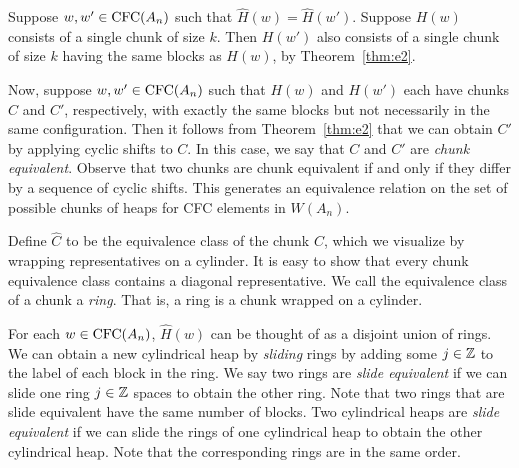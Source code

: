     Suppose $w,w' \in \operatorname{\mathrm{CFC}}(A_n)$ such that $\hat{H}(w) = \hat{H}(w')$. Suppose $H(w)$ consists of a single chunk of size $k$. Then $H(w')$ also consists of a single chunk of size $k$ having the same blocks as $H(w)$, by Theorem~\ref{thm:e2}.
    
    Now, suppose $w,w' \in \operatorname{\mathrm{CFC}}(A_n)$ such that $H(w)$ and $H(w')$ each have chunks $C$ and $C'$, respectively, with exactly the same blocks but not necessarily in the same configuration. Then it follows from Theorem~\ref{thm:e2} that we can obtain $C'$ by applying cyclic shifts to $C$.
    In this case, we say that $C$ and $C'$ are \emph{chunk equivalent}.
    Observe that two chunks are chunk equivalent if and only if they differ by a sequence of cyclic shifts. This generates an equivalence relation on the set of possible chunks of heaps for CFC elements in $W(A_n)$.

    Define $\hat{C}$ to be the equivalence class of the chunk $C$, which we visualize by wrapping representatives on a cylinder. It is easy to show that every chunk equivalence class contains a diagonal representative.
    We call the equivalence class of a chunk a \emph{ring}. That is, a ring is a chunk wrapped on a cylinder.
    
    For each $w \in \operatorname{\mathrm{CFC}}(A_n)$, $\hat{H}(w)$ can be thought of as a disjoint union of rings. We can obtain a new cylindrical heap by \emph{sliding} rings by adding some $j \in \mathbb{Z}$ to the label of each block in the ring.
    We say two rings are \emph{slide equivalent} if we can slide one ring $j \in \mathbb{Z}$ spaces to obtain the other ring.
    Note that two rings that are slide equivalent have the same number of blocks.
    Two cylindrical heaps are \emph{slide equivalent} if we can slide the rings of one cylindrical heap to obtain the other cylindrical heap.
    Note that the corresponding rings are in the same order.

